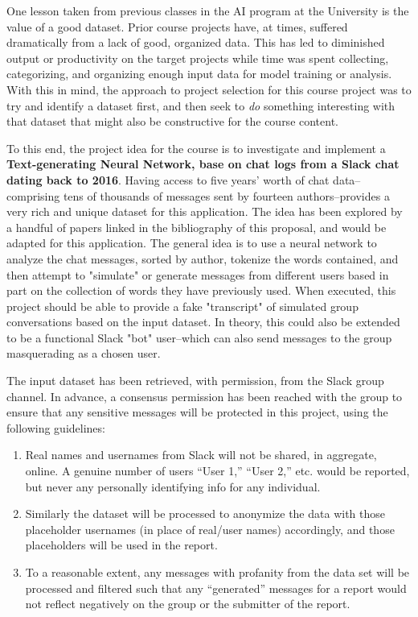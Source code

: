 \documentclass[11pt]{article}
\begin{document}
  
  \graphicspath{{./images/}}

One lesson taken from previous classes in the AI program at the University is the value of a good dataset.
Prior course projects have, at times, suffered dramatically from a lack of good, organized data.
This has led to diminished output or productivity on the target projects while time was spent collecting, categorizing, and organizing enough input data for model training or analysis.
With this in mind, the approach to project selection for this course project was to try and identify a dataset first, and then seek to \textit{do} something interesting with that dataset that might also be constructive for the course content.

To this end, the project idea for the course is to investigate and implement a \textbf{Text-generating Neural Network, base on chat logs from a Slack chat dating back to 2016}.
Having access to five years' worth of chat data--comprising tens of thousands of messages sent by fourteen authors--provides a very rich and unique dataset for this application.
The idea has been explored by a handful of papers linked in the bibliography of this proposal, and would be adapted for this application. \cite{KarpathyTheNetworks} \cite{Sha2018Order-PlanningData} \cite{Xie2017NeuralGuide} \cite{Zhang2017AdversarialGeneration} 
The general idea is to use a neural network to analyze the chat messages, sorted by author, tokenize the words contained, and then attempt to "simulate" or generate messages from different users based in part on the collection of words they have previously used.
When executed, this project should be able to provide a fake "transcript" of simulated group conversations based on the input dataset.
In theory, this could also be extended to be a functional Slack "bot" user--which can also send messages to the group masquerading as a chosen user.

The input dataset has been retrieved, with permission, from the Slack group channel.
In advance, a consensus permission has been reached with the group to ensure that any sensitive messages will be protected in this project, using the following guidelines:
\begin{enumerate}
    \item Real names and usernames from Slack will not be shared, in aggregate, online. A genuine number of users “User 1,” “User 2,” etc. would be reported, but never any personally identifying info for any individual.
    \item Similarly the dataset will be processed to anonymize the data with those placeholder usernames (in place of real/user names) accordingly, and those placeholders will be used in the report.
    \item To a reasonable extent, any messages with profanity from the data set will be processed and filtered such that any “generated” messages for a report would not reflect negatively on the group or the submitter of the report.
\end{enumerate}
\end{document}
